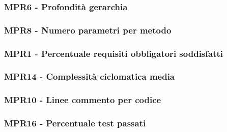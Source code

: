 \subsubsection{MPR6 - Profondità gerarchia}
\subsubsection{MPR8 - Numero parametri per metodo}
\subsubsection{MPR1 - Percentuale requisiti obbligatori soddisfatti}
\subsubsection{MPR14 - Complessità ciclomatica media}
\subsubsection{MPR10 - Linee commento per codice}
\subsubsection{MPR16 - Percentuale test passati}
